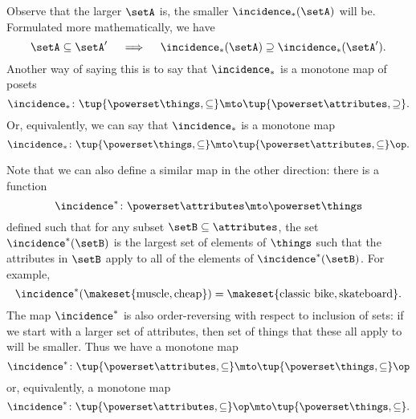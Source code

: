 Observe that the larger $\setA$ is, the smaller $\incidence_*(\setA)$ will be. Formulated more mathematically, we have
\begin{equation}\label{eq:fca-example-pushforward-7}
\setA \subseteq \setA' \quad \implies \quad \incidence_*(\setA) \supseteq \incidence_*(\setA').
\end{equation}
Another way of saying this is to say that $\incidence_*$ is a monotone map of posets 
\begin{equation}\label{eq:fca-example-pushforward-8}
\incidence_* \colon \tup{\powerset \things, \subseteq} \mto \tup{\powerset \attributes, \supseteq}. 
\end{equation}
Or, equivalently, we can say that $\incidence_*$ is a monotone map
\begin{equation}\label{eq:fca-example-pushforward-9}
\incidence_* \colon \tup{\powerset \things, \subseteq} \mto \tup{\powerset \attributes, \subseteq}\op. 
\end{equation}

Note that we can also define a similar map in the other direction: there is a function
\begin{equation}\label{eq:fca-example-pullback-1}
\incidence^* \colon \powerset \attributes \mto \powerset \things
\end{equation}
defined such that for any subset $\setB \subseteq \attributes$, the set $\incidence^*(\setB)$ is the largest set of elements of $\things$ such that the attributes in $\setB$ apply to all of the elements of $\incidence^*(\setB)$. 
For example, 
\begin{equation}
\incidence^*(\makeset{\text{muscle}, \text{cheap}}) = \makeset{\text{classic bike}, \text{skateboard}}.
\end{equation}
The map $\incidence^*$  is also order-reversing with respect to inclusion of sets: if we start with a larger set of attributes, then set of things that these all apply to will be smaller. Thus we have a monotone map 
\begin{equation}\label{eq:fca-example-pullback-2}
\incidence^* \colon \tup{\powerset \attributes, \subseteq} \mto \tup{\powerset \things, \subseteq}\op
\end{equation}
or, equivalently, a monotone map
\begin{equation}\label{eq:fca-example-pullback-3}
\incidence^* \colon \tup{\powerset \attributes, \subseteq}\op \mto \tup{\powerset \things, \subseteq}.
\end{equation}

